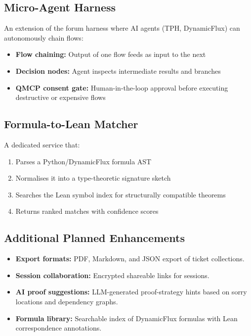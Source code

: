 \subsection{Micro-Agent Harness}

An extension of the forum harness where AI agents (TPH, DynamicFlux) can
autonomously chain flows:

\begin{itemize}
  \item \textbf{Flow chaining:} Output of one flow feeds as input to the next
  \item \textbf{Decision nodes:} Agent inspects intermediate results and
        branches
  \item \textbf{QMCP consent gate:} Human-in-the-loop approval before
        executing destructive or expensive flows
\end{itemize}

\subsection{Formula-to-Lean Matcher}

A dedicated service that:

\begin{enumerate}
  \item Parses a Python/DynamicFlux formula AST
  \item Normalises it into a type-theoretic signature sketch
  \item Searches the Lean symbol index for structurally compatible theorems
  \item Returns ranked matches with confidence scores
\end{enumerate}

\subsection{Additional Planned Enhancements}

\begin{itemize}
  \item \textbf{Export formats:} PDF, Markdown, and JSON export of ticket
        collections.
  \item \textbf{Session collaboration:} Encrypted shareable links for sessions.
  \item \textbf{AI proof suggestions:} LLM-generated proof-strategy hints
        based on sorry locations and dependency graphs.
  \item \textbf{Formula library:} Searchable index of DynamicFlux formulas
        with Lean correspondence annotations.
\end{itemize}
